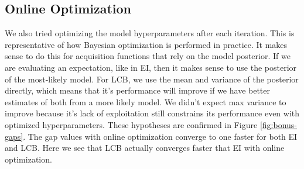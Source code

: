 \documentclass[11pt]{article}
\numberwithin{equation}{section}
\begin{document}
\subsection*{Online Optimization}
We also tried optimizing the model hyperparameters after each iteration. This
is representative of how Bayesian optimization is performed in practice. It
makes sense to do this for acquisition functions that rely on the model posterior. If we are evaluating an expectation, like in EI, then it makes sense to use the posterior of the most-likely model. For LCB, we use the mean and variance of the posterior directly, which means that it's performance will improve if we have better estimates of both from a more likely model. We didn't expect max variance to improve because it's lack of exploitation still constrains its performance even with optimized hyperparameters. These hypotheses are confirmed in Figure \ref{fig:bonus-gaps}. The gap values with online optimization converge to one faster for both EI and LCB. Here we see that LCB actually converges faster that EI with online optimization.
\end{document}
